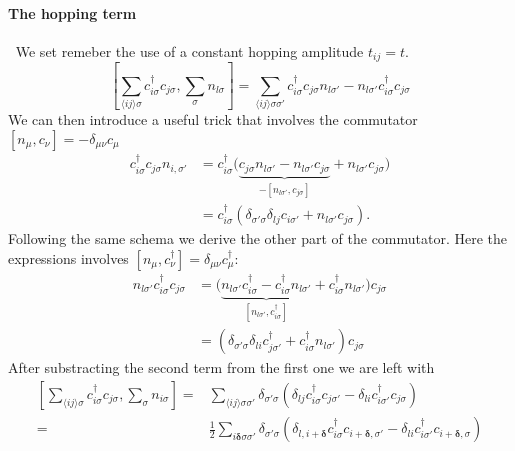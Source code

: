 \documentclass[../main.tex]{subfile}
\begin{document}
\paragraph{The hopping term} $~$ We set remeber the use of a constant hopping amplitude $t_{ij} = t$.
\[
    \left[ \sum_{\langle ij\rangle\sigma} c_{i\sigma}^{\dagger}c_{j\sigma} , \sum_{\sigma} n_{l\sigma}\right] 
    = \sum_{\langle ij\rangle\sigma\sigma'}  c_{i\sigma}^{\dagger}c_{j\sigma}n_{l\sigma'} - n_{l\sigma'}c_{i\sigma}^{\dagger}c_{j\sigma}
\]
We can then introduce a useful trick that involves the commutator $[n_{\mu},c_{\nu}] = -\delta_{\mu\nu}c_{\mu}$
\begin{equation*}
    \begin{aligned}
    c_{i\sigma}^{\dagger}c_{j\sigma}n_{i,\sigma'} &= c_{i\sigma}^{\dagger} \bigl( \underbrace{c_{j\sigma}n_{l\sigma'} 
    -n_{l\sigma'}c_{j\sigma}}_{-[n_{l\sigma'},c_{j\sigma}]} + n_{l\sigma'}c_{j\sigma}\bigr) \\
    & = c_{i\sigma}^{\dagger} \left(\delta_{\sigma'\sigma}\delta_{lj}c_{i\sigma'} + n_{l\sigma'}c_{j\sigma}\right).
    \end{aligned}
\end{equation*}
Following the same schema we derive the other part of the commutator. Here the expressions involves
$[n_{\mu}, c^{\dagger}_{\nu}] = \delta_{\mu\nu}c^{\dagger}_{\mu}$:
\begin{equation*}
    \begin{aligned}
        n_{l\sigma'}c_{i\sigma}^{\dagger}c_{j\sigma} &= \bigl( \underbrace{n_{l\sigma'}c_{i\sigma}^{\dagger} 
        - c_{i\sigma}^{\dagger}n_{l\sigma'}}_{[n_{l\sigma'}, c^{\dagger}_{i\sigma}]} + c_{i\sigma}^{\dagger}n_{l\sigma'} \bigr)c_{j\sigma} \\
        &= \left(\delta_{\sigma'\sigma}\delta_{li}c_{j\sigma'}^{\dagger} + c_{i\sigma}^{\dagger}n_{l\sigma'} \right)c_{j\sigma}
    \end{aligned}
\end{equation*}
After substracting the second term from the first one we are left with
\begin{equation*}
    \begin{aligned}
    \left[ \sum_{\langle ij\rangle\sigma} c_{i\sigma}^{\dagger}c_{j\sigma} , \sum_{\sigma} n_{i\sigma}\right] 
    =&\sum_{\langle ij\rangle\sigma\sigma'} \delta_{\sigma'\sigma} \left( \delta_{lj}c_{i\sigma}^{\dagger} c_{j\sigma'} - \delta_{li}c_{i\sigma'}^{\dagger}c_{j\sigma}\right)\\
    =& \frac{1}{2}\sum_{ i \bm{\delta}\sigma\sigma'} \delta_{\sigma'\sigma} \left( \delta_{l,i+ \bm{\delta}}c_{i\sigma}^{\dagger} c_{i+ \bm{\delta},\sigma'} - \delta_{li}c_{i\sigma'}^{\dagger}c_{i+ \bm{\delta},\sigma}\right)
\end{aligned}
\end{equation*}
\end{document}
